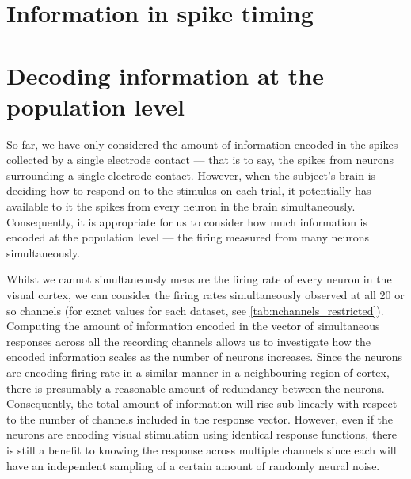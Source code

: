 \section{Information in spike timing}



\section{Decoding information at the population level}
\label{sec:dec-meth-lin}

So far, we have only considered the amount of information encoded in the spikes collected by a single electrode contact --- that is to say, the spikes from neurons surrounding a single electrode contact.
However, when the subject's brain is deciding how to respond on to the stimulus on each trial, it potentially has available to it the spikes from every neuron in the brain simultaneously.
Consequently, it is appropriate for us to consider how much information is encoded at the population level --- the firing measured from many neurons simultaneously.


Whilst we cannot simultaneously measure the firing rate of every neuron in the visual cortex, we can consider the firing rates simultaneously observed at all \num{20} or so channels (for exact values for each dataset, see \autoref{tab:nchannels_restricted}).
Computing the amount of information encoded in the vector of simultaneous responses across all the recording channels allows us to investigate how the encoded information scales as the number of neurons increases.
Since the neurons are encoding firing rate in a similar manner in a neighbouring region of cortex, there is presumably a reasonable amount of redundancy between the neurons.
Consequently, the total amount of information will rise sub-linearly with respect to the number of channels included in the response vector.
However, even if the neurons are encoding visual stimulation using identical response functions, there is still a benefit to knowing the response across multiple channels since each will have an independent sampling of a certain amount of randomly neural noise.


